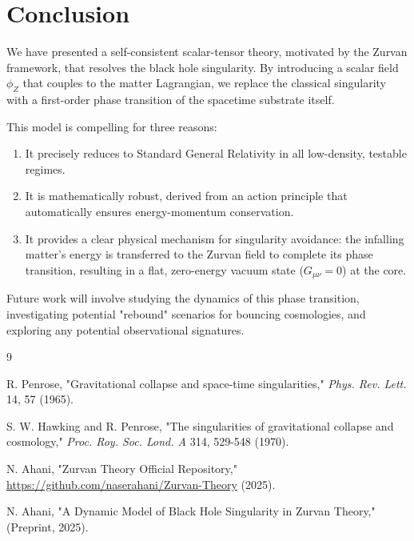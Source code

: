 \documentclass[12pt, a4paper]{article}
\newcommand{\phiZ}{\phi_Z}
\begin{document}
\section{Conclusion}

We have presented a self-consistent scalar-tensor theory, motivated by the Zurvan framework, that resolves the black hole singularity. By introducing a scalar field $\phiZ$ that couples to the matter Lagrangian, we replace the classical singularity with a first-order phase transition of the spacetime substrate itself.

This model is compelling for three reasons:
\begin{enumerate}
    \item It precisely reduces to Standard General Relativity in all low-density, testable regimes.
    \item It is mathematically robust, derived from an action principle that automatically ensures energy-momentum conservation.
    \item It provides a clear physical mechanism for singularity avoidance: the infalling matter's energy is transferred to the Zurvan field to complete its phase transition, resulting in a flat, zero-energy vacuum state ($G_{\mu\nu}=0$) at the core.
\end{enumerate}

Future work will involve studying the dynamics of this phase transition, investigating potential "rebound" scenarios for bouncing cosmologies, and exploring any potential observational signatures.

\begin{thebibliography}{9}

R. Penrose, "Gravitational collapse and space-time singularities," \textit{Phys. Rev. Lett.} 14, 57 (1965).

S. W. Hawking and R. Penrose, "The singularities of gravitational collapse and cosmology," \textit{Proc. Roy. Soc. Lond. A} 314, 529-548 (1970).

N. Ahani, "Zurvan Theory Official Repository," \url{https://github.com/naserahani/Zurvan-Theory} (2025).

N. Ahani, "A Dynamic Model of Black Hole Singularity in Zurvan Theory," (Preprint, 2025).

\end{thebibliography}

\end{document}
